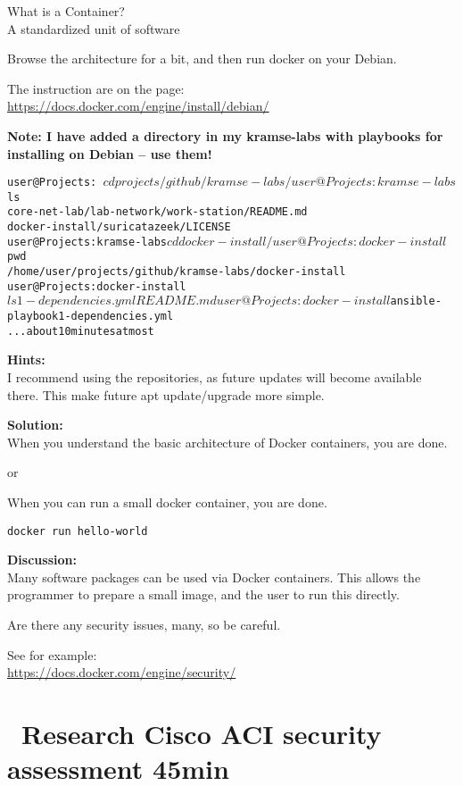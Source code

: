 \documentclass[a4paper,11pt,notitlepage]{report}
\begin{document}
What is a Container?\\
A standardized unit of software

Browse the architecture for a bit, and then run docker on your Debian.

The instruction are on the page:\\
\url{https://docs.docker.com/engine/install/debian/}

{\bf Note: I have added a directory in my kramse-labs with playbooks for installing on Debian -- use them!}

\begin{alltt}\small
user@Projects:~$ cd projects/github/kramse-labs/
user@Projects:kramse-labs$ ls
core-net-lab/	 lab-network/	work-station/  README.md
docker-install/  suricatazeek/	LICENSE
user@Projects:kramse-labs$ cd docker-install/
user@Projects:docker-install$ pwd
/home/user/projects/github/kramse-labs/docker-install
user@Projects:docker-install$ ls
1-dependencies.yml  README.md
user@Projects:docker-install$ ansible-playbook 1-dependencies.yml
... about 10 minutes at most
\end{alltt}

{\bf Hints:}\\
I recommend using the repositories, as future updates will become available there. This make future apt update/upgrade more simple.

{\bf Solution:}\\
When you understand the basic architecture of Docker containers, you are done.

or

When you can run a small docker container, you are done.


\begin{verbatim}
docker run hello-world
\end{verbatim}


{\bf Discussion:}\\
Many software packages can be used via Docker containers. This allows the programmer to prepare a small image, and the user to run this directly.

Are there any security issues, many, so be careful.

See for example: \\
\url{https://docs.docker.com/engine/security/}



\chapter{\faExclamationTriangle\ Research Cisco ACI security assessment 45min}
\label{ex:cisco-aci-ernw}
\end{document}
